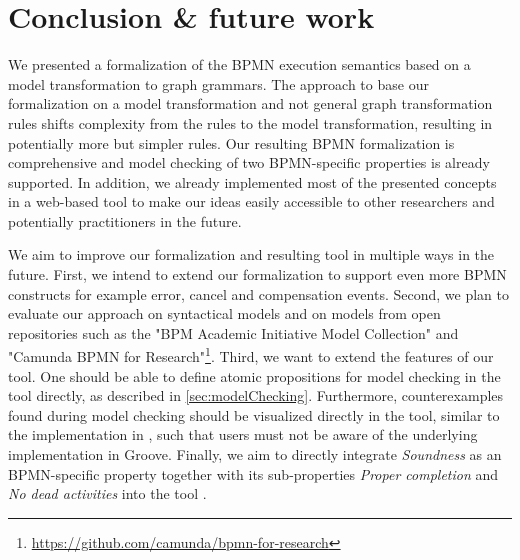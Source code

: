 \documentclass[adraft, copyright, creativecommons]{eptcs} %
\begin{document}
\section{Conclusion \& future work} \label{sec:conclusion}
We presented a formalization of the BPMN execution semantics based on a model transformation to graph grammars.
The approach to base our formalization on a model transformation and not general graph transformation rules shifts complexity from the rules to the model transformation, resulting in potentially more but simpler rules.
Our resulting BPMN formalization is comprehensive and model checking of two BPMN-specific properties is already supported.
In addition, we already implemented most of the presented concepts in a web-based tool to make our ideas easily accessible to other researchers and potentially practitioners in the future.

We aim to improve our formalization and resulting tool in multiple ways in the future.
First, we intend to extend our formalization to support even more BPMN constructs for example error, cancel and compensation events.
Second, we plan to evaluate our approach on syntactical models and on models from open repositories such as the "BPM Academic Initiative Model Collection" \cite{weskeModelCollectionBusiness2020} and "Camunda BPMN for
Research"\footnote{\url{https://github.com/camunda/bpmn-for-research}}.
Third, we want to extend the features of our tool.
One should be able to define atomic propositions for model checking in the tool directly, as described in \cref{sec:modelChecking}.
Furthermore, counterexamples found during model checking should be visualized directly in the tool, similar to the implementation in \cite{houhouFirstOrderLogicVerification2022}, such that users must not be aware of the underlying implementation in Groove.
Finally, we aim to directly integrate \emph{Soundness} as an BPMN-specific property together with its sub-properties \emph{Proper completion} and \emph{No dead activities} into the tool \cite{corradiniClassificationBPMNCollaborations2018}.

\end{document}
